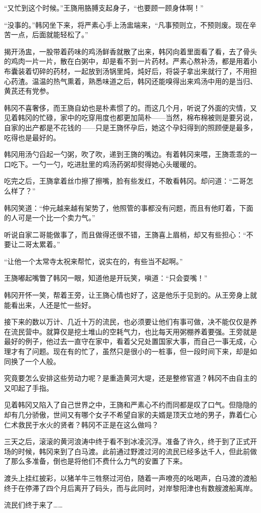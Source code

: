 “又忙到这个时候。”王旖用胳膊支起身子，“也要顾一顾身体啊！”

“没事的。”韩冈坐下来，将严素心手上汤盅端来，“凡事预则立，不预则废。现在辛苦一点，后面就能轻松了。”

揭开汤盅，一股带着药味的鸡汤鲜香就散了出来，韩冈向着里面看了看，去了骨头的鸡肉一片一片，散在白粥中，却是看不到一片药材。严素心熬补汤，都是用着小布囊装着切碎的药材，一起放到汤锅里炖，炖好后，将袋子拿出来就行了，不用担心药渣。温温的热气熏着，熟悉味道之后，韩冈还能嗅得出来鸡汤中用的是当归、黄芪还有党参。

韩冈不喜奢侈，而王旖自幼也是朴素惯了的。而这几个月，听说了外面的灾情，又见着韩冈的忙碌，家中的吃穿用度也都更加简朴——当然，棉布棉被则是要另说，自家的出产都是不花钱的——只是王旖怀孕后，她这个孕妇得到的照顾便是最多，吃得也是最好的。

韩冈用汤勺舀起一勺粥，吹了吹，递到王旖的嘴边。有着韩冈来喂，王旖乖乖的一口吃下。一勺一勺，吃进肚里的鸡汤药粥却熨得她心头暖暖的。

吃完之后，王旖拿着丝巾擦了擦嘴，脸有些发红，不敢看韩冈。却问道：“二哥怎么样了？”

韩冈笑道：“仲元越来越有架势了，他照管的事都没有问题，而且有他盯着，下面的人可是一个比一个卖力气。”

听说自家二哥能做事了，而且做得还很不错，王旖喜上眉梢，却又有些担心：“不要让二哥太累着。”

“让他一个太常寺太祝来帮忙，说实在的，有些当不起啊。”

王旖嘟起嘴瞥了韩冈一眼，知道他是开玩笑，嗔道：“只会耍嘴！”

韩冈开怀一笑，帮着王旁，让王旖心情也好了，这是他乐于见到的。从王旁身上就能看出来，人还是忙一些好。

接下来的数以万计、几近十万的流民，也必须要让他们有事可做，决不能仅仅是养在流民营中。就算仅是挖土堆山的空耗气力，也比每天用粥棚养着要强。王旁就是最好的例子，他过去一直守在家中，看着父兄处置国家大事，而自己一事无成，心理才有了问题。现在有的忙了，虽然只是很小的一桩事，但一段时间下来，却是如同换了一个人般。

究竟要怎么安排这些劳动力呢？是重造黄河大堤，还是整修官道？韩冈不由自主的又叩起了手指。

见着韩冈又陷入了自己世界之中，王旖和严素心不约而同都是叹了口气。但隐隐的却有几分骄傲，世间又有哪个女子不希望自家的夫婿是顶天立地的男子，靠着仁心仁术救民于水火的贤者？韩冈不正是在这么做吗？

三天之后，滚滚的黄河浪涛中终于看不到冰凌沉浮。准备了许久，终于到了正式开场的时候，韩冈来到了白马渡。此前通过野渡过河的流民已经多达千人，但此前做了那么多准备，倒也是将他们不费什么力气的安置了下来。

渡头上挂红披彩，以猪羊牛三牲祭过河伯，随着一声嘹亮的吆喝声，白马渡的渡船终于在停滞了四个月后离开了码头，而与此同时，对岸黎阳津也有数艘渡船离岸。

流民们终于来了……


